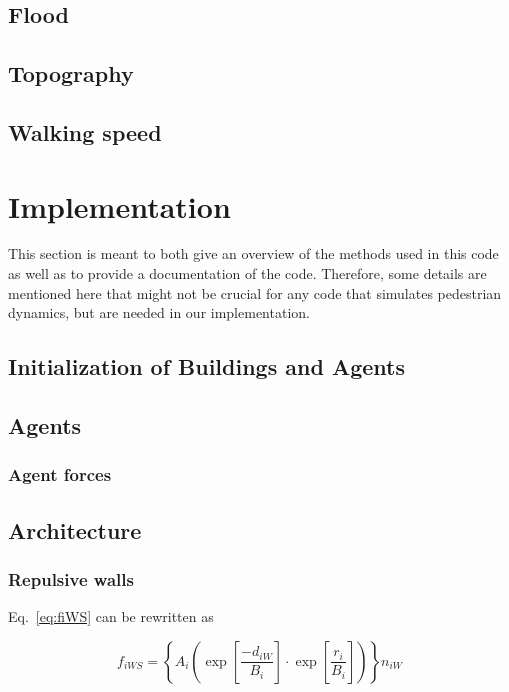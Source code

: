 \documentclass[11pt]{article}
\begin{document}
\subsection{Flood}

\subsection{Topography}

\subsection{Walking speed}



\section{Implementation}

This section is meant to both give an overview of the methods used in this code as well as to provide a documentation of the code. Therefore, some details are mentioned here that might not be crucial for any code that simulates pedestrian dynamics, but are needed in our implementation. 

\subsection{Initialization of Buildings and Agents}

\subsection{Agents}

\subsubsection{Agent forces}


\subsection{Architecture}

\subsubsection{Repulsive walls}

Eq.~\eqref{eq:fiWS} can be rewritten as

\begin{equation}
	{f_{iWS}} = \left\{ {{A_i}\left( {\exp \left[ {\frac{{ - {d_{iW}}}}{{{B_i}}}} \right] \cdot \exp \left[ {\frac{{{r_i}}}{{{B_i}}}} \right]} \right)} \right\}{n_{iW}}
	\label{eq:fiWS2}
\end{equation}
\end{document}
